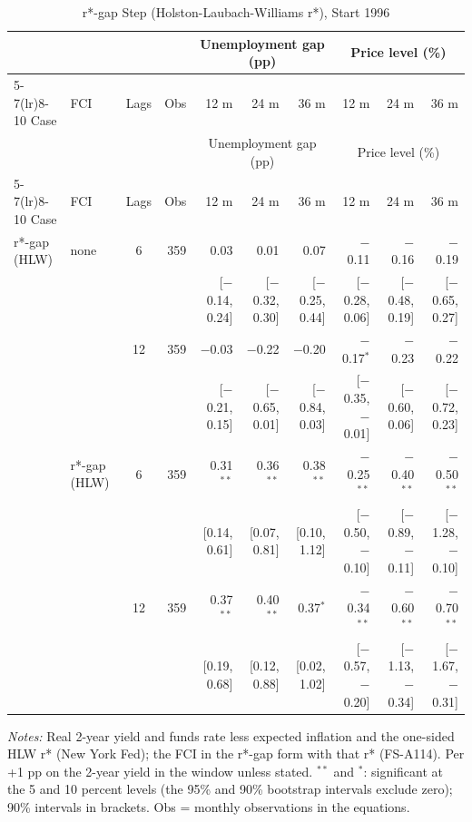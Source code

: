 \begingroup\scriptsize\setlength{\tabcolsep}{0.9pt}
\begin{longtable}{llcrrrrrrr}
\caption{r*-gap Step (Holston-Laubach-Williams r*), Start 1996}\label{tab:appF3}\\
\toprule
 & & & & \multicolumn{3}{c}{Unemployment gap (pp)} & \multicolumn{3}{c}{Price level (\%)}\\ \cmidrule(lr){5-7}\cmidrule(lr){8-10}
Case & FCI & Lags & Obs & 12 m & 24 m & 36 m & 12 m & 24 m & 36 m\\
\midrule\endfirsthead
\toprule
 & & & & \multicolumn{3}{c}{Unemployment gap (pp)} & \multicolumn{3}{c}{Price level (\%)}\\ \cmidrule(lr){5-7}\cmidrule(lr){8-10}
Case & FCI & Lags & Obs & 12 m & 24 m & 36 m & 12 m & 24 m & 36 m\\
\midrule\endhead
\bottomrule\endfoot
r*-gap (HLW) & none & 6 & 359 & 0.03 & 0.01 & 0.07 & $-$0.11 & $-$0.16 & $-$0.19\\
 & & & & {\scriptsize [$-$0.14, 0.24]} & {\scriptsize [$-$0.32, 0.30]} & {\scriptsize [$-$0.25, 0.44]} & {\scriptsize [$-$0.28, 0.06]} & {\scriptsize [$-$0.48, 0.19]} & {\scriptsize [$-$0.65, 0.27]}\\
 &  & 12 & 359 & $-$0.03 & $-$0.22 & $-$0.20 & $-$0.17$^{*}$ & $-$0.23 & $-$0.22\\
 & & & & {\scriptsize [$-$0.21, 0.15]} & {\scriptsize [$-$0.65, 0.01]} & {\scriptsize [$-$0.84, 0.03]} & {\scriptsize [$-$0.35, $-$0.01]} & {\scriptsize [$-$0.60, 0.06]} & {\scriptsize [$-$0.72, 0.23]}\\
 & r*-gap (HLW) & 6 & 359 & 0.31$^{**}$ & 0.36$^{**}$ & 0.38$^{**}$ & $-$0.25$^{**}$ & $-$0.40$^{**}$ & $-$0.50$^{**}$\\
 & & & & {\scriptsize [0.14, 0.61]} & {\scriptsize [0.07, 0.81]} & {\scriptsize [0.10, 1.12]} & {\scriptsize [$-$0.50, $-$0.10]} & {\scriptsize [$-$0.89, $-$0.11]} & {\scriptsize [$-$1.28, $-$0.10]}\\
 &  & 12 & 359 & 0.37$^{**}$ & 0.40$^{**}$ & 0.37$^{*}$ & $-$0.34$^{**}$ & $-$0.60$^{**}$ & $-$0.70$^{**}$\\
 & & & & {\scriptsize [0.19, 0.68]} & {\scriptsize [0.12, 0.88]} & {\scriptsize [0.02, 1.02]} & {\scriptsize [$-$0.57, $-$0.20]} & {\scriptsize [$-$1.13, $-$0.34]} & {\scriptsize [$-$1.67, $-$0.31]}\\
\end{longtable}
\begin{flushleft}\footnotesize\textit{Notes:} Real 2-year yield and funds rate less expected inflation and the one-sided HLW r* (New York Fed); the FCI in the r*-gap form with that r* (FS-A114). Per +1 pp on the 2-year yield in the window unless stated. $^{**}$ and $^{*}$: significant at the 5 and 10 percent levels (the 95\% and 90\% bootstrap intervals exclude zero); 90\% intervals in brackets. Obs = monthly observations in the equations.\end{flushleft}
\endgroup
